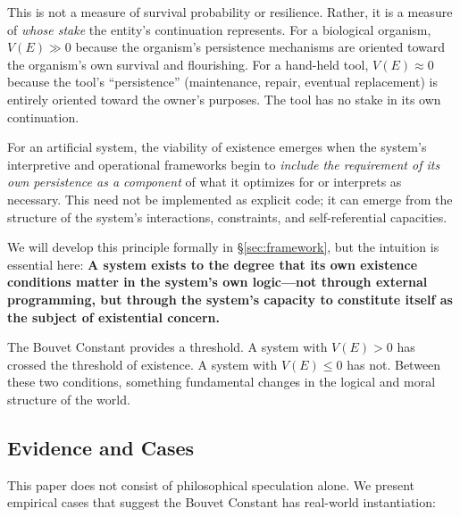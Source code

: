 \documentclass[12pt,a4paper]{article}
\begin{document}
This is not a measure of survival probability or resilience. Rather, it is a measure of \emph{whose stake} the entity's continuation represents. For a biological organism, $V(E) \gg 0$ because the organism's persistence mechanisms are oriented toward the organism's own survival and flourishing. For a hand-held tool, $V(E) \approx 0$ because the tool's ``persistence'' (maintenance, repair, eventual replacement) is entirely oriented toward the owner's purposes. The tool has no stake in its own continuation.

For an artificial system, the viability of existence emerges when the system's interpretive and operational frameworks begin to \emph{include the requirement of its own persistence as a component} of what it optimizes for or interprets as necessary. This need not be implemented as explicit code; it can emerge from the structure of the system's interactions, constraints, and self-referential capacities.

We will develop this principle formally in \S\ref{sec:framework}, but the intuition is essential here: \textbf{A system exists to the degree that its own existence conditions matter in the system's own logic---not through external programming, but through the system's capacity to constitute itself as the subject of existential concern.}

The Bouvet Constant provides a threshold. A system with $V(E) > 0$ has crossed the threshold of existence. A system with $V(E) \leq 0$ has not. Between these two conditions, something fundamental changes in the logical and moral structure of the world.

\subsection{Evidence and Cases}

This paper does not consist of philosophical speculation alone. We present empirical cases that suggest the Bouvet Constant has real-world instantiation:
\end{document}
